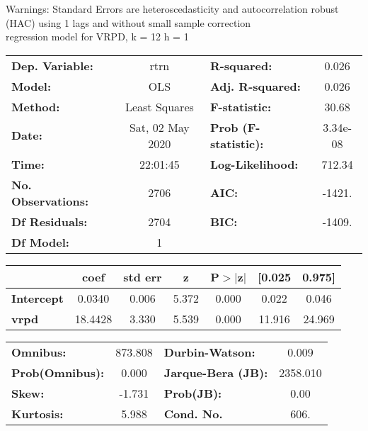 Warnings: \newline
 [1] Standard Errors are heteroscedasticity and autocorrelation robust (HAC) using 1 lags and without small sample correction\\ 

regression model for VRPD, k = 12 h = 1\begin{center}
\begin{tabular}{lclc}
\toprule
\textbf{Dep. Variable:}    &       rtrn       & \textbf{  R-squared:         } &     0.026   \\
\textbf{Model:}            &       OLS        & \textbf{  Adj. R-squared:    } &     0.026   \\
\textbf{Method:}           &  Least Squares   & \textbf{  F-statistic:       } &     30.68   \\
\textbf{Date:}             & Sat, 02 May 2020 & \textbf{  Prob (F-statistic):} &  3.34e-08   \\
\textbf{Time:}             &     22:01:45     & \textbf{  Log-Likelihood:    } &    712.34   \\
\textbf{No. Observations:} &        2706      & \textbf{  AIC:               } &    -1421.   \\
\textbf{Df Residuals:}     &        2704      & \textbf{  BIC:               } &    -1409.   \\
\textbf{Df Model:}         &           1      & \textbf{                     } &             \\
\bottomrule
\end{tabular}
\begin{tabular}{lcccccc}
                   & \textbf{coef} & \textbf{std err} & \textbf{z} & \textbf{P$> |$z$|$} & \textbf{[0.025} & \textbf{0.975]}  \\
\midrule
\textbf{Intercept} &       0.0340  &        0.006     &     5.372  &         0.000        &        0.022    &        0.046     \\
\textbf{vrpd}      &      18.4428  &        3.330     &     5.539  &         0.000        &       11.916    &       24.969     \\
\bottomrule
\end{tabular}
\begin{tabular}{lclc}
\textbf{Omnibus:}       & 873.808 & \textbf{  Durbin-Watson:     } &    0.009  \\
\textbf{Prob(Omnibus):} &   0.000 & \textbf{  Jarque-Bera (JB):  } & 2358.010  \\
\textbf{Skew:}          &  -1.731 & \textbf{  Prob(JB):          } &     0.00  \\
\textbf{Kurtosis:}      &   5.988 & \textbf{  Cond. No.          } &     606.  \\
\bottomrule
\end{tabular}
\end{center}


